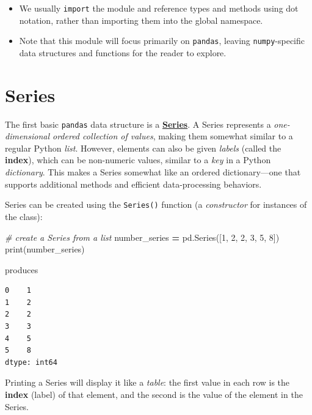 \documentclass[]{book}
\newenvironment{Shaded}{\begin{snugshade}}{\end{snugshade}}
\newcommand{\DecValTok}[1]{\textcolor[rgb]{0.00,0.00,0.81}{#1}}
\newcommand{\CommentTok}[1]{\textcolor[rgb]{0.56,0.35,0.01}{\textit{#1}}}
\newcommand{\OperatorTok}[1]{\textcolor[rgb]{0.81,0.36,0.00}{\textbf{#1}}}
\newcommand{\BuiltInTok}[1]{#1}
\newcommand{\NormalTok}[1]{#1}
\begin{document}
\begin{itemize}
\item
  We usually \texttt{import} the module and reference types and methods
  using dot notation, rather than importing them into the global
  namespace.
\item
  Note that this module will focus primarily on \texttt{pandas}, leaving
  \texttt{numpy}-specific data structures and functions for the reader
  to explore.
\end{itemize}

\hypertarget{series}{\section{Series}\label{series}}

The first basic \texttt{pandas} data structure is a
\href{http://pandas.pydata.org/pandas-docs/stable/generated/pandas.Series.html}{\textbf{Series}}.
A Series represents a \emph{one-dimensional ordered collection of
values}, making them somewhat similar to a regular Python \emph{list}.
However, elements can also be given \emph{labels} (called the
\textbf{index}), which can be non-numeric values, similar to a
\emph{key} in a Python \emph{dictionary}. This makes a Series somewhat
like an ordered dictionary---one that supports additional methods and
efficient data-processing behaviors.

Series can be created using the \texttt{Series()} function (a
\emph{constructor} for instances of the class):

\begin{Shaded}
\begin{Highlighting}[]
\CommentTok{# create a Series from a list}
\NormalTok{number_series }\OperatorTok{=}\NormalTok{ pd.Series([}\DecValTok{1}\NormalTok{, }\DecValTok{2}\NormalTok{, }\DecValTok{2}\NormalTok{, }\DecValTok{3}\NormalTok{, }\DecValTok{5}\NormalTok{, }\DecValTok{8}\NormalTok{])}
\BuiltInTok{print}\NormalTok{(number_series)}
\end{Highlighting}
\end{Shaded}

produces

\begin{verbatim}
0    1
1    2
2    2
3    3
4    5
5    8
dtype: int64
\end{verbatim}

Printing a Series will display it like a \emph{table}: the first value
in each row is the \textbf{index} (label) of that element, and the
second is the value of the element in the Series.
\end{document}
